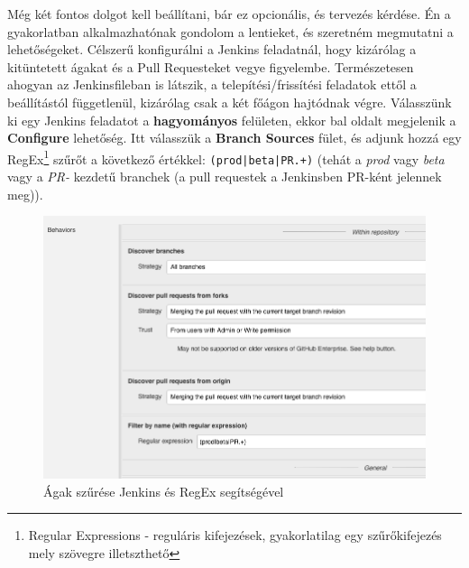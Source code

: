Még két fontos dolgot kell beállítani, bár ez opcionális, és tervezés kérdése. Én a gyakorlatban alkalmazhatónak gondolom a lentieket, és szeretném megmutatni a lehetőségeket. Célszerű konfigurálni a Jenkins feladatnál, hogy kizárólag a kitüntetett ágakat és a Pull Requesteket vegye figyelembe. Természetesen ahogyan az Jenkinsfileban is látszik, a telepítési/frissítési feladatok ettől a beállítástól függetlenül, kizárólag csak a két főágon hajtódnak végre. Válasszünk ki egy Jenkins feladatot a \textbf{hagyományos} felületen, ekkor bal oldalt megjelenik a \textbf{Configure} lehetőség. Itt válasszük a \textbf{Branch Sources} fület, és adjunk hozzá egy RegEx\footnote{Regular Expressions - reguláris kifejezések, gyakorlatilag egy szűrőkifejezés mely szövegre illetszthető} szűrőt a következő értékkel: \lstinline{(prod|beta|PR.+)} (tehát a \textit{prod} vagy \textit{beta} vagy a \textit{PR-} kezdetű branchek (a pull requestek a Jenkinsben PR-ként jelennek meg)).
\begin{figure}[ht]
\centering
\includegraphics[width=150mm, keepaspectratio]{img/jenkinsbranch.png}
\caption{Ágak szűrése Jenkins és RegEx segítségével}
\end{figure}
\newpage
